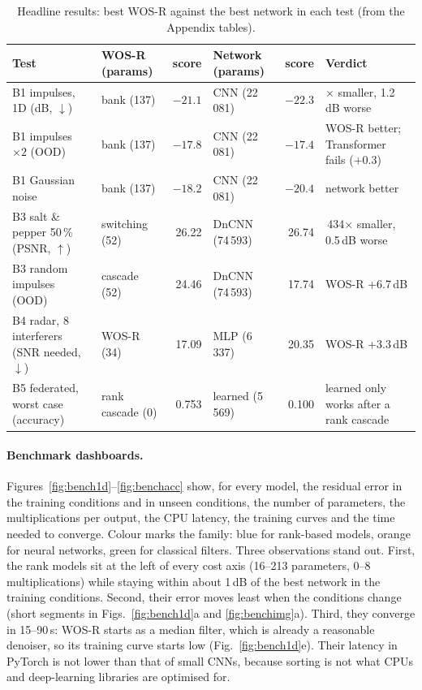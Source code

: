 \documentclass[11pt,a4paper]{article}
\begin{document}
\begin{table}[t]\centering\small
\caption{Headline results: best WOS-R against the best network in each test (from the Appendix tables).}\label{tab:summary}
\setlength{\tabcolsep}{4pt}
\begin{tabularx}{\linewidth}{@{}>{\raggedright\arraybackslash}p{3.1cm}lrlr>{\raggedright\arraybackslash}X@{}}\toprule
Test & WOS-R (params) & score & Network (params) & score & Verdict\\\midrule
B1 impulses, 1D (dB, $\downarrow$) & bank (137) & $-21.1$ & CNN (22\,081) & $-22.3$ & 161$\times$ smaller, 1.2\,dB worse\\
B1 impulses $\times2$ (OOD) & bank (137) & $-17.8$ & CNN (22\,081) & $-17.4$ & WOS-R better; Transformer fails ($+0.3$)\\
B1 Gaussian noise & bank (137) & $-18.2$ & CNN (22\,081) & $-20.4$ & network better\\
B3 salt \& pepper 50\,\% (PSNR, $\uparrow$) & switching (52) & 26.22 & DnCNN (74\,593) & 26.74 & 1\,434$\times$ smaller, 0.5\,dB worse\\
B3 random impulses (OOD) & cascade (52) & 24.46 & DnCNN (74\,593) & 17.74 & WOS-R +6.7\,dB\\
B4 radar, 8 interferers (SNR needed, $\downarrow$) & WOS-R (34) & 17.09 & MLP (6\,337) & 20.35 & WOS-R +3.3\,dB\\
B5 federated, worst case (accuracy) & rank cascade (0) & 0.753 & learned (5\,569) & 0.100 & learned only works after a rank cascade\\
\bottomrule\end{tabularx}
\end{table}

\paragraph{Benchmark dashboards.} Figures~\ref{fig:bench1d}--\ref{fig:benchacc} show, for every model, the residual
error in the training conditions and in unseen conditions, the number of parameters, the multiplications per output, the
CPU latency, the training curves and the time needed to converge. Colour marks the family: blue for rank-based models,
orange for neural networks, green for classical filters. Three observations stand out. First, the rank models sit at
the left of every cost axis (16--213 parameters, 0--8 multiplications) while staying within about 1\,dB of the best
network in the training conditions. Second, their error moves least when the conditions change (short segments in
Figs.~\ref{fig:bench1d}a and \ref{fig:benchimg}a). Third, they converge in 15--90\,s: WOS-R starts as a median
filter, which is already a reasonable denoiser, so its training curve starts low (Fig.~\ref{fig:bench1d}e). Their
latency in PyTorch is not lower than that of small CNNs, because sorting is not what CPUs and deep-learning libraries
are optimised for.
\end{document}
